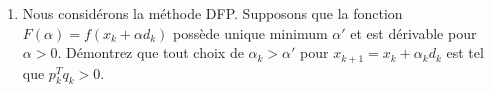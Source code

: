 \begin{enumerate}
    \begin{solution}
    \end{solution}

  \item Nous considérons la méthode DFP. Supposons que la fonction $F(\alpha)= f(x_k+ \alpha d_k)$  possède unique minimum $\alpha'$ et est
    dérivable pour
    $\alpha >0$. Démontrez que tout choix de $\alpha_k > \alpha'$ pour $x_{k+1}=x_k + \alpha_k d_k$ est tel que
    $p_k^T q_k >0$.

    \begin{solution}
    \end{solution}

\end{enumerate}
